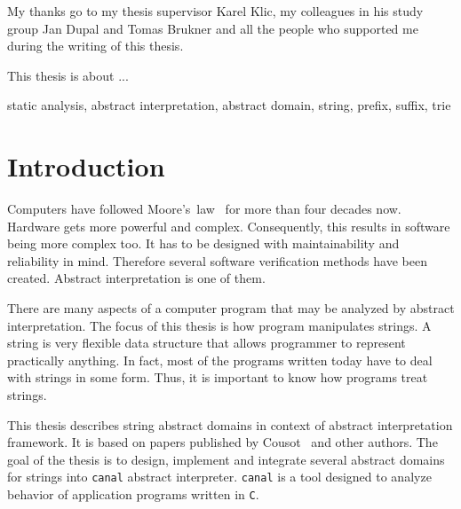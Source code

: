 \documentclass[12pt,final,oneside]{fithesis2}
\theoremstyle{definition}
\newcommand\emptypage{\newpage\null\thispagestyle{empty}\newpage}
\begin{document}
\FrontMatter
\ThesisTitlePage

\emptypage

\begin{ThesisDeclaration}
  \DeclarationText
  \AdvisorName
\end{ThesisDeclaration}

\begin{ThesisThanks}
My thanks go to my thesis supervisor Karel Klic, my colleagues in his
study group Jan Dupal and Tomas Brukner and all the people who
supported me during the writing of this thesis.
\end{ThesisThanks}

\begin{ThesisAbstract}
This thesis is about ...
\end{ThesisAbstract}

\begin{ThesisKeyWords}
static analysis, abstract interpretation, abstract domain, string,
prefix, suffix, trie
\end{ThesisKeyWords}

\MainMatter

\tableofcontents


\chapter{Introduction}

Computers have followed Moore's~law~\cite{Moore65-1} for more than
four decades now. Hardware gets more powerful and complex. Consequently,
this results in software being more complex too. It has to be designed
with maintainability and reliability in mind. Therefore several software
verification methods have been created. Abstract interpretation is one
of them.

There are many aspects of a computer program that may be analyzed by
abstract interpretation. The focus of this thesis is how program manipulates
strings. A string is very flexible data structure that allows programmer
to represent practically anything. In fact, most of the programs written
today have to deal with strings in some form. Thus, it is important to know
how programs treat strings.

This thesis describes string abstract domains in context of abstract
interpretation framework. It is based on papers published
by Cousot~\cite{CousotCousot77-1} and other authors. The goal of the thesis
is to design, implement and integrate several abstract domains for strings
into \texttt{canal} abstract interpreter. \texttt{canal} is a tool designed
to analyze behavior of application programs written in \texttt{C}.
\end{document}
